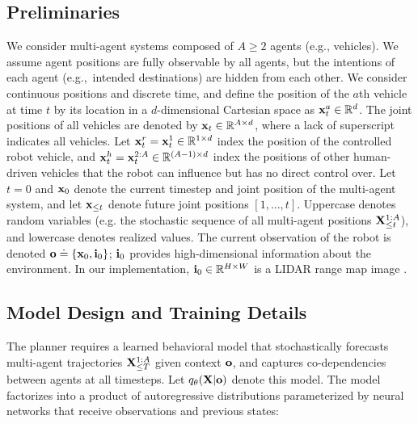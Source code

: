 \documentclass[conference]{IEEEtran}
\begin{document}
\subsection{Preliminaries}

We consider multi-agent systems composed of $A\geq2$ agents (e.g., vehicles). We assume agent positions are fully observable by all agents, but the intentions of each agent (e.g.,\ intended destinations) are hidden from each other. We consider continuous positions and discrete time, and define the position of the $a$th vehicle at time $t$ by its location in a $d$-dimensional Cartesian space as $\mathbf{x}^a_t \in\mathbb{R}^{d}$.
The joint positions of all vehicles are denoted  by $\mathbf{x}_t\in\mathbb{R}^{A\times d}$, where a lack of superscript indicates all vehicles.
Let $\mathbf{x}_t^r=\mathbf{x}_t^1\in\mathbb{R}^{1\times d}$ index the position of the controlled robot vehicle, and $\mathbf{x}_t^h=\mathbf{x}_t^{2:A}\in\mathbb{R}^{(A-1)\times d}$ index the positions of other human-driven vehicles that the robot can influence but has no direct control over. Let $t=0$ and $\mathbf{x}_0$ denote the current timestep and joint position of the multi-agent system, and let $\mathbf{x}_{\leq t}$ denote future joint positions $[1, \dots, t]$.
Uppercase denotes random variables (e.g. the stochastic sequence of all multi-agent positions $\mathbf{X}_{\leq t}^{1:A}$), and lowercase denotes realized values.
The current observation of the robot is denoted ${\mathbf{o}} \doteq \{\mathbf{x}_0, \mathbf{i}_0\}$; $\mathbf{i}_0$ provides high-dimensional information about the environment.
In our implementation, $\mathbf{i}_0\in\mathbb{R}^{H\times W}$ is a LIDAR range map image \cite{caccia2018deep}.

\subsection{Model Design and Training Details}
\label{sec:model_design}
The planner requires a learned behavioral model that stochastically forecasts multi-agent trajectories $\mathbf{X}_{\leq T}^{1:A}$ given context $\mathbf{o}$, and
captures co-dependencies between agents at all timesteps. Let $q_\theta(\mathbf{X}|\mathbf{o})$ denote this model.
The model factorizes into a product of autoregressive distributions parameterized by neural networks that receive observations and previous states:
\end{document}
